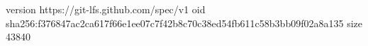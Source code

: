 version https://git-lfs.github.com/spec/v1
oid sha256:f376847ac2ca617f66e1ee07c7f42b8c70c38ed54fb611c58b3bb09f02a8a135
size 43840
